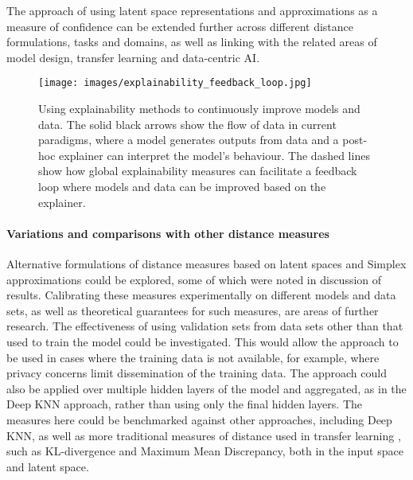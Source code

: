 \documentclass{article}
\begin{document}
The approach of using latent space representations and approximations as a measure of confidence can be extended further across different distance formulations, tasks and domains, as well as linking with the related areas of model design, transfer learning and data-centric AI.

\begin{figure}[ht]
  \centering
  \texttt{[image: images/explainability\_feedback\_loop.jpg]}
  \caption{Using explainability methods to continuously improve models and data. The solid black arrows show the flow of data in current paradigms, where a model generates outputs from data and a post-hoc explainer can interpret the model's behaviour. The dashed lines show how global explainability measures can facilitate a feedback loop where models and data can be improved based on the explainer.}
  \label{explainability_loop}
\end{figure}


\paragraph{Variations and comparisons with other distance measures}
Alternative formulations of distance measures based on latent spaces and Simplex approximations could be explored, some of which were noted in discussion of results.
Calibrating these measures experimentally on different models and data sets, as well as theoretical guarantees for such measures, are areas of further research.
The effectiveness of using validation sets from data sets other than that used to train the model could be investigated. This would allow the approach to be used in cases where the training data is not available, for example, where privacy concerns limit dissemination of the training data.
The approach could also be applied over multiple hidden layers of the model and aggregated, as in the Deep KNN approach, rather than using only the final hidden layers. The measures here could be benchmarked against other approaches, including Deep KNN, as well as more traditional measures of distance used in transfer learning \cite{zhuang_comprehensive_2021}, such as KL-divergence and Maximum Mean Discrepancy, both in the input space and latent space.
\end{document}
